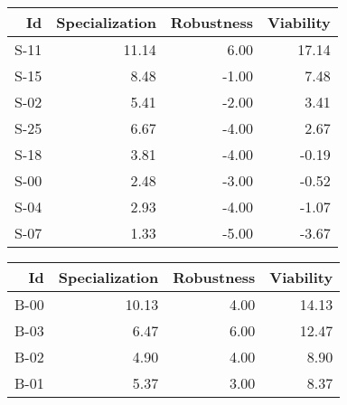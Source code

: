 


\begin{tabular}{ | r | r | r | r | }
    \hline
                    Id  &  Specialization  &      Robustness  &       Viability  \\
    \hline
    \hline
                  S-11  &           11.14  &            6.00  &           17.14  \\
    \hline
                  S-15  &            8.48  &           -1.00  &            7.48  \\
    \hline
                  S-02  &            5.41  &           -2.00  &            3.41  \\
    \hline
                  S-25  &            6.67  &           -4.00  &            2.67  \\
    \hline
                  S-18  &            3.81  &           -4.00  &           -0.19  \\
    \hline
                  S-00  &            2.48  &           -3.00  &           -0.52  \\
    \hline
                  S-04  &            2.93  &           -4.00  &           -1.07  \\
    \hline
                  S-07  &            1.33  &           -5.00  &           -3.67  \\
    \hline
\end{tabular}


\begin{tabular}{ | r | r | r | r | }
    \hline
                    Id  &  Specialization  &      Robustness  &       Viability  \\
    \hline
    \hline
                  B-00  &           10.13  &            4.00  &           14.13  \\
    \hline
                  B-03  &            6.47  &            6.00  &           12.47  \\
    \hline
                  B-02  &            4.90  &            4.00  &            8.90  \\
    \hline
                  B-01  &            5.37  &            3.00  &            8.37  \\
    \hline
\end{tabular}



